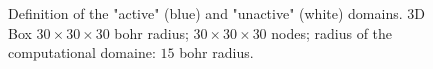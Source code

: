 \documentclass[11pt,a4paper]{article}
\begin{document}
\begin{figure}
  \caption{Definition of the "active" (blue) and "unactive" (white) domains. 3D Box $30\times 30\times 30$ bohr radius; $30 \times 30 \times 30$ nodes; radius of the computational domaine: $15$ bohr radius.}
  \label{fig:domain3D}
\end{figure}
\end{document}
